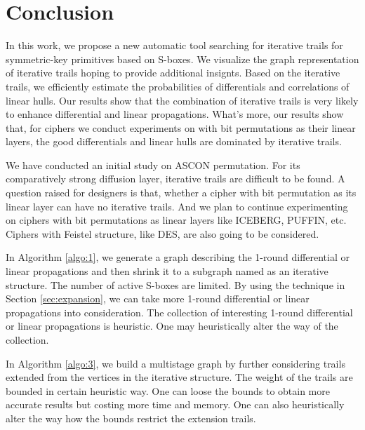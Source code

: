 \section{Conclusion\label{sec:conclusion}}

In this work, we propose a new automatic tool searching for iterative trails for symmetric-key primitives based on S-boxes. We visualize the graph representation of iterative trails hoping to provide additional insignts. Based on the iterative trails, we efficiently estimate the probabilities of differentials and correlations of linear hulls. Our results show that the combination of iterative trails is very likely to enhance differential and linear propagations. What's more, our results show that, for ciphers we conduct experiments on with bit permutations as their linear layers, the good differentials and linear hulls are dominated by iterative trails. 

We have conducted an initial study on ASCON permutation. For its comparatively strong diffusion layer, iterative trails are difficult to be found. A question raised for designers is that, whether a cipher with bit permutation as its linear layer can have no iterative trails. And we plan to continue experimenting on ciphers with bit permutations as linear layers like ICEBERG, PUFFIN, etc. Ciphers with Feistel structure, like DES, are also going to be considered. 

In Algorithm \ref{algo:1}, we generate a graph describing the 1-round differential or linear propagations and then shrink it to a subgraph named as an iterative structure. The number of active S-boxes are limited. By using the technique in Section \ref{sec:expansion}, we can take more 1-round differential or linear propagations into consideration. The collection of interesting 1-round differential or linear propagations is heuristic. One may heuristically alter the way of the collection. 

In Algorithm \ref{algo:3}, we build a multistage graph by further considering trails extended from the vertices in the iterative structure. The weight of the trails are bounded in certain heuristic way. One can loose the bounds to obtain more accurate results but costing more time and memory. One can also heuristically alter the way how the bounds restrict the extension trails. 

